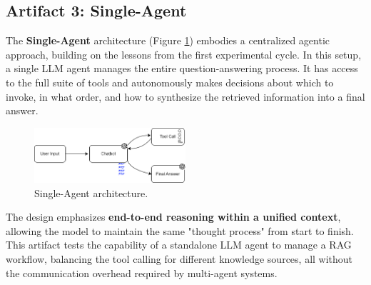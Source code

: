 

    \subsection{Artifact 3: Single-Agent}

        The \textbf{Single-Agent} architecture (Figure \ref{fig:diagrama_single_agent}) embodies a centralized agentic approach, building on the lessons from the first experimental cycle. In this setup, a single LLM agent manages the entire question-answering process. It has access to the full suite of tools and autonomously makes decisions about which to invoke, in what order, and how to synthesize the retrieved information into a final answer.
        
        \begin{figure}[h]
            \centering
            \includegraphics[width=0.5\textwidth]{images_exp2/diagrams/diagrama_single_agent.png}
            \caption{Single-Agent architecture.}
            \label{fig:diagrama_single_agent}
        \end{figure}    

        The design emphasizes \textbf{end-to-end reasoning within a unified context}, allowing the model to maintain the same "thought process" from start to finish. This artifact tests the capability of a standalone LLM agent to manage a RAG workflow, balancing the tool calling for different knowledge sources, all without the communication overhead required by multi-agent systems.
        
